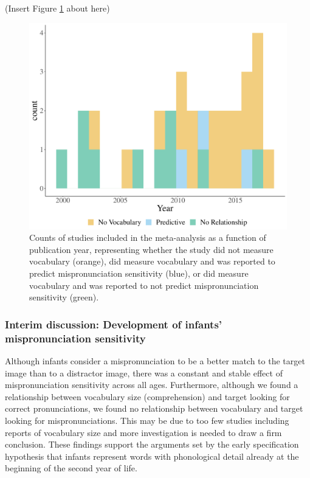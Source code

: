 \documentclass[man]{apa6}
\begin{document}
(Insert Figure \ref{fig:Vocabdescribe1} about here)

\begin{figure}
\centering
\includegraphics{VonHolzenBergmann_MPMetaAnalysis_files/figure-latex/Vocabdescribe1-1.pdf}
\caption{\label{fig:Vocabdescribe1}Counts of studies included in the meta-analysis as a function of publication year, representing whether the study did not measure vocabulary (orange), did measure vocabulary and was reported to predict mispronunciation sensitivity (blue), or did measure vocabulary and was reported to not predict mispronunciation sensitivity (green).}
\end{figure}

\hypertarget{interim-discussion-development-of-infants-mispronunciation-sensitivity}{%
\subsubsection{Interim discussion: Development of infants' mispronunciation sensitivity}\label{interim-discussion-development-of-infants-mispronunciation-sensitivity}}

Although infants consider a mispronunciation to be a better match to the target image than to a distractor image, there was a constant and stable effect of mispronunciation sensitivity across all ages. Furthermore, although we found a relationship between vocabulary size (comprehension) and target looking for correct pronunciations, we found no relationship between vocabulary and target looking for mispronunciations. This may be due to too few studies including reports of vocabulary size and more investigation is needed to draw a firm conclusion. These findings support the arguments set by the early specification hypothesis that infants represent words with phonological detail already at the beginning of the second year of life.
\end{document}
